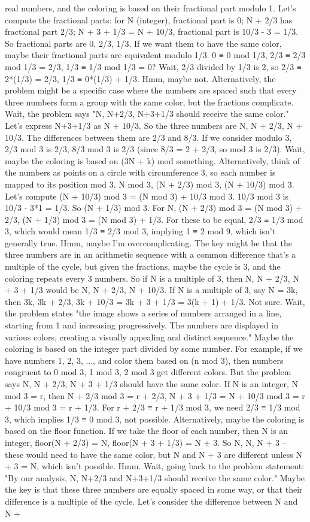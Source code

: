 real numbers, and the coloring is based on their fractional part modulo 1. Let's compute the fractional parts: for N (integer), fractional part is 0; N + 2/3 has fractional part 2/3; N + 3 + 1/3 = N + 10/3, fractional part is 10/3 - 3 = 1/3. So fractional parts are 0, 2/3, 1/3. If we want them to have the same color, maybe their fractional parts are equivalent modulo 1/3. 0 ≡ 0 mod 1/3, 2/3 ≡ 2/3 mod 1/3 = 2/3, 1/3 ≡ 1/3 mod 1/3 = 0? Wait, 2/3 divided by 1/3 is 2, so 2/3 ≡ 2*(1/3) = 2/3, 1/3 ≡ 0*(1/3) + 1/3. Hmm, maybe not. Alternatively, the problem might be a specific case where the numbers are spaced such that every three numbers form a group with the same color, but the fractions complicate. Wait, the problem says "N, N+2/3, N+3+1/3 should receive the same color." Let's express N+3+1/3 as N + 10/3. So the three numbers are N, N + 2/3, N + 10/3. The differences between them are 2/3 and 8/3. If we consider modulo 3, 2/3 mod 3 is 2/3, 8/3 mod 3 is 2/3 (since 8/3 = 2 + 2/3, so mod 3 is 2/3). Wait, maybe the coloring is based on (3N + k) mod something. Alternatively, think of the numbers as points on a circle with circumference 3, so each number is mapped to its position mod 3. N mod 3, (N + 2/3) mod 3, (N + 10/3) mod 3. Let's compute (N + 10/3) mod 3 = (N mod 3) + 10/3 mod 3. 10/3 mod 3 is 10/3 - 3*1 = 1/3. So (N + 1/3) mod 3. For N, (N + 2/3) mod 3 = (N mod 3) + 2/3, (N + 1/3) mod 3 = (N mod 3) + 1/3. For these to be equal, 2/3 ≡ 1/3 mod 3, which would mean 1/3 ≡ 2/3 mod 3, implying 1 ≡ 2 mod 9, which isn't generally true. Hmm, maybe I'm overcomplicating. The key might be that the three numbers are in an arithmetic sequence with a common difference that's a multiple of the cycle, but given the fractions, maybe the cycle is 3, and the coloring repeats every 3 numbers. So if N is a multiple of 3, then N, N + 2/3, N + 3 + 1/3 would be N, N + 2/3, N + 10/3. If N is a multiple of 3, say N = 3k, then 3k, 3k + 2/3, 3k + 10/3 = 3k + 3 + 1/3 = 3(k + 1) + 1/3. Not sure. Wait, the problem states "the image shows a series of numbers arranged in a line, starting from 1 and increasing progressively. The numbers are displayed in various colors, creating a visually appealing and distinct sequence." Maybe the coloring is based on the integer part divided by some number. For example, if we have numbers 1, 2, 3, ..., and color them based on (n mod 3), then numbers congruent to 0 mod 3, 1 mod 3, 2 mod 3 get different colors. But the problem says N, N + 2/3, N + 3 + 1/3 should have the same color. If N is an integer, N mod 3 = r, then N + 2/3 mod 3 = r + 2/3, N + 3 + 1/3 = N + 10/3 mod 3 = r + 10/3 mod 3 = r + 1/3. For r + 2/3 ≡ r + 1/3 mod 3, we need 2/3 ≡ 1/3 mod 3, which implies 1/3 ≡ 0 mod 3, not possible. Alternatively, maybe the coloring is based on the floor function. If we take the floor of each number, then N is an integer, floor(N + 2/3) = N, floor(N + 3 + 1/3) = N + 3. So N, N, N + 3 – these would need to have the same color, but N and N + 3 are different unless N + 3 = N, which isn't possible. Hmm. Wait, going back to the problem statement: "By our analysis, N, N+2/3 and N+3+1/3 should receive the same color." Maybe the key is that these three numbers are equally spaced in some way, or that their difference is a multiple of the cycle. Let's consider the difference between N and N + 
